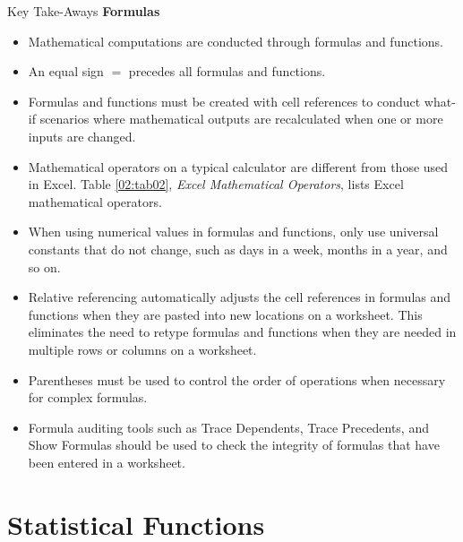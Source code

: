 \begin{center}
	\begin{tkwbox}{Key Take-Aways}
		\textbf{Formulas}
		\\
		\begin{itemize}
			\setlength{\itemsep}{0pt}
			\setlength{\parskip}{0pt}
			\setlength{\parsep}{0pt}
			
			\item Mathematical computations are conducted through formulas and functions.
			\item An equal sign $ = $ precedes all formulas and functions.
			\item Formulas and functions must be created with cell references to conduct what-if scenarios where mathematical outputs are recalculated when one or more inputs are changed.
			\item Mathematical operators on a typical calculator are different from those used in Excel. Table \ref{02:tab02}, \textit{Excel Mathematical Operators}, lists Excel mathematical operators.
			\item When using numerical values in formulas and functions, only use universal constants that do not change, such as days in a week, months in a year, and so on.
			\item Relative referencing automatically adjusts the cell references in formulas and functions when they are pasted into new locations on a worksheet. This eliminates the need to retype formulas and functions when they are needed in multiple rows or columns on a worksheet.
			\item Parentheses must be used to control the order of operations when necessary for complex formulas.
			\item Formula auditing tools such as Trace Dependents, Trace Precedents, and Show Formulas should be used to check the integrity of formulas that have been entered in a worksheet.
			
		\end{itemize}
	\end{tkwbox}
\end{center}

\section{Statistical Functions}\label{ch02:statistical_functions}

